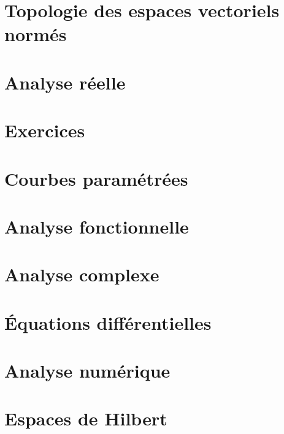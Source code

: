 \chapter{Topologie des espaces vectoriels normés}      \label{ChapEspVectNorm}


\chapter{Analyse réelle}














\chapter{Exercices}             \label{Chap_exercices}



\chapter{Courbes paramétrées}           \label{Chap_courbes}


\chapter{Analyse fonctionnelle}


\chapter{Analyse complexe}


\chapter{Équations différentielles}


\chapter{Analyse numérique}


\chapter{Espaces de Hilbert}



